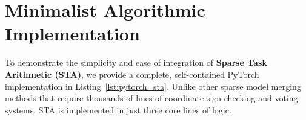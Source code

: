\documentclass{article}
\theoremstyle{plain}
\theoremstyle{definition}
\theoremstyle{remark}
\begin{document}










\newpage
\appendix
\onecolumn
\section{Minimalist Algorithmic Implementation}
\label{app:code}

To demonstrate the simplicity and ease of integration of \textbf{Sparse Task Arithmetic (STA)}, we provide a complete, self-contained PyTorch implementation in Listing~\ref{lst:pytorch_sta}. Unlike other sparse model merging methods that require thousands of lines of coordinate sign-checking and voting systems, STA is implemented in just three core lines of logic.
\end{document}
